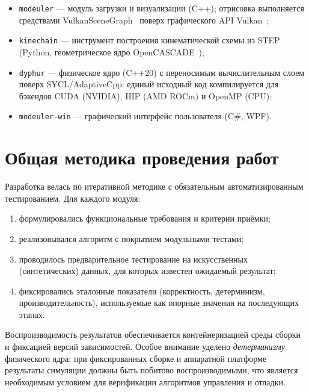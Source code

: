 \begin{itemize}
  \item \texttt{modeuler} --- модуль загрузки и визуализации (C++); отрисовка
        выполняется средствами VulkanSceneGraph~\cite{vsg} поверх графического API Vulkan~\cite{vulkan};
  \item \texttt{kinechain} --- инструмент построения кинематической схемы из STEP
        (Python, геометрическое ядро OpenCASCADE~\cite{opencascade});
  \item \texttt{dyphur} --- физическое ядро (C++20) с переносимым вычислительным
        слоем поверх SYCL/AdaptiveCpp: единый исходный код компилируется для
        бэкендов CUDA (NVIDIA), HIP (AMD ROCm) и OpenMP (CPU);
  \item \texttt{modeuler-win} --- графический интерфейс пользователя (C\#, WPF).
\end{itemize}


\section{Общая методика проведения работ}

Разработка велась по итеративной методике с обязательным автоматизированным
тестированием. Для каждого модуля:
\begin{enumerate}
  \item формулировались функциональные требования и критерии приёмки;
  \item реализовывался алгоритм с покрытием модульными тестами;
  \item проводилось предварительное тестирование на искусственных
        (синтетических) данных, для которых известен ожидаемый результат;
  \item фиксировались эталонные показатели (корректность, детерминизм,
        производительность), используемые как опорные значения на последующих
        этапах.
\end{enumerate}

Воспроизводимость результатов обеспечивается контейнеризацией среды сборки и
фиксацией версий зависимостей. Особое внимание уделено \emph{детерминизму}
физического ядра: при фиксированных сборке и аппаратной платформе результаты
симуляции должны быть побитово воспроизводимыми, что является необходимым
условием для верификации алгоритмов управления и отладки.
